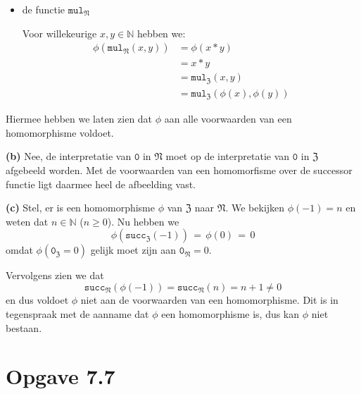 \documentclass[a4paper,11pt]{article}
\begin{document}
\begin{description}
\begin{itemize}
\item{de functie $\texttt{mul}_{\mathfrak{N}}$}

  Voor willekeurige $x,y \in \mathbb{N}$ hebben we:
  \begin{align*}
    \phi(\texttt{mul}_{\mathfrak{N}}(x,y)) &= \phi(x*y) \\
                                           &= x*y \\
                                           &= \texttt{mul}_{\mathfrak{Z}}(x,y) \\
                                           &= \texttt{mul}_{\mathfrak{Z}}(\phi(x),\phi(y))
  \end{align*}

\end{itemize}

Hiermee hebben we laten zien dat $\phi$ aan alle voorwaarden van een
homomorphisme voldoet.

\item{\bf (b)} %
Nee, de interpretatie van $\texttt{0}$ in $\mathfrak{N}$ moet op de
interpretatie van $\texttt{0}$ in $\mathfrak{Z}$ afgebeeld worden. Met de
voorwaarden van een homomorfisme over de successor functie ligt daarmee heel
de afbeelding vast.

\item{\bf (c)} %
Stel, er is een homomorphisme $\phi$ van $\mathfrak{Z}$ naar
$\mathfrak{N}$. We bekijken $\phi(-1)=n$ en weten dat $n \in \mathbb{N}$ ($n
\ge 0$). Nu hebben we
\begin{displaymath}
\phi(\texttt{succ}_{\mathfrak{Z}}(-1)) \, = \, \phi(0) \, = \, 0
\end{displaymath}
omdat $\phi(\texttt{0}_{\mathfrak{Z}}=0)$ gelijk moet zijn aan
$\texttt{0}_{\mathfrak{N}} = 0$.

Vervolgens zien we dat
\begin{displaymath}
\texttt{succ}_{\mathfrak{N}}(\phi(-1)) = \texttt{succ}_{\mathfrak{N}}(n) = n+1 \ne 0
\end{displaymath}
en dus voldoet $\phi$ niet aan de voorwaarden van een homomorphisme. Dit is in
tegenspraak met de aanname dat $\phi$ een homomorphisme is, dus kan $\phi$ niet
bestaan.

\end{description}




\section*{Opgave 7.7}
\end{document}
